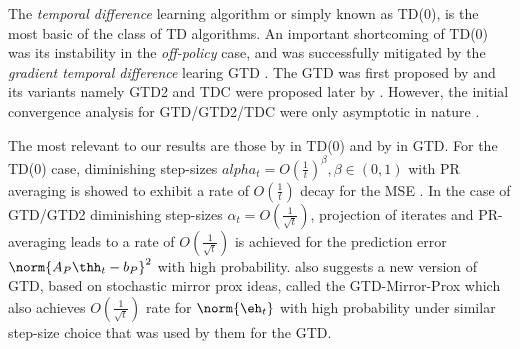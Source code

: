 The \emph{temporal difference} learning algorithm or simply known as TD(0), is the most basic of the class of TD algorithms. An important shortcoming of TD(0) was its instability in the \emph{off-policy} case, and was successfully mitigated by the \emph{gradient temporal difference} learing GTD \cite{gtd2}. The GTD was first proposed by \citet{gtd} and its variants namely GTD2 and TDC were proposed later by \citet{gtd2}. However, the initial convergence analysis for GTD/GTD2/TDC were only asymptotic in nature \cite{gtd,gtd2}.\par
The most relevant to our results are those by \citet{korda-prashanth} in TD(0) and by \citet{gtdmp} in GTD. For the TD(0) case,  diminishing step-sizes $alpha_t=O(\frac{1}{t})^\beta,\beta \in(0,1)$ with PR averaging is showed to exhibit a rate of $O(\frac{1}{t})$ decay for the MSE \cite{korda-prashanth}. In the case of GTD/GTD2 diminishing step-sizes $\alpha_t=O(\frac{1}{\sqrt{t}})$, projection of iterates and PR-averaging leads to a rate of $O(\frac{1}{\sqrt{t}})$ is achieved for the prediction error $\norm{A_P\thh_t-b_P}^2$ with high probability. \citet{gtdmp} also suggests a new version of GTD, based on stochastic mirror prox ideas, called the GTD-Mirror-Prox which also achieves $O(\frac{1}{\sqrt{t}})$ rate for $\norm{\eh_t}$ with high probability under similar step-size choice that was used by them for the GTD.
